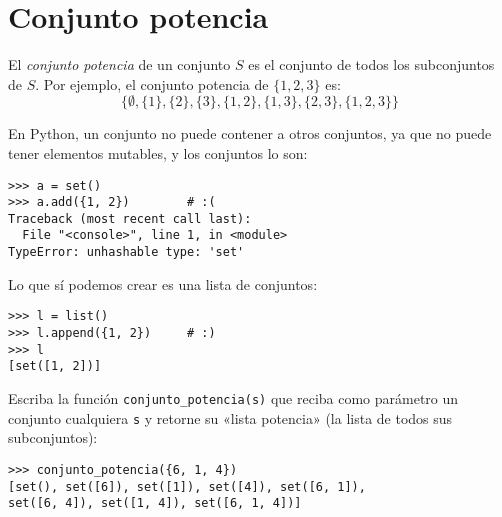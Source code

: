 \section{Conjunto potencia}

El \emph{conjunto potencia} de un conjunto \(S\) es el conjunto de todos
los subconjuntos de \(S\).
Por ejemplo, el conjunto potencia de \(\{1, 2, 3\}\) es:
\[
  \bigl\{
    \emptyset,
    \{1\},
    \{2\},
    \{3\},
    \{1, 2\},
    \{1, 3\},
    \{2, 3\},
    \{1, 2, 3\}
  \bigr\}
\]

En Python, un conjunto no puede contener a otros conjuntos, ya que no
puede tener elementos mutables, y los conjuntos lo son:
\begin{lstlisting}
>>> a = set()
>>> a.add({1, 2})        # :(
Traceback (most recent call last):
  File "<console>", line 1, in <module>
TypeError: unhashable type: 'set'
\end{lstlisting}

Lo que sí podemos crear es una lista de conjuntos:
\begin{lstlisting}
>>> l = list()
>>> l.append({1, 2})     # :)
>>> l
[set([1, 2])]
\end{lstlisting}

Escriba la función \lstinline!conjunto_potencia(s)! que reciba como
parámetro un conjunto cualquiera \lstinline!s! y retorne su «lista
potencia» (la lista de todos sus subconjuntos):
\begin{lstlisting}
>>> conjunto_potencia({6, 1, 4})
[set(), set([6]), set([1]), set([4]), set([6, 1]),
set([6, 4]), set([1, 4]), set([6, 1, 4])]
\end{lstlisting}

